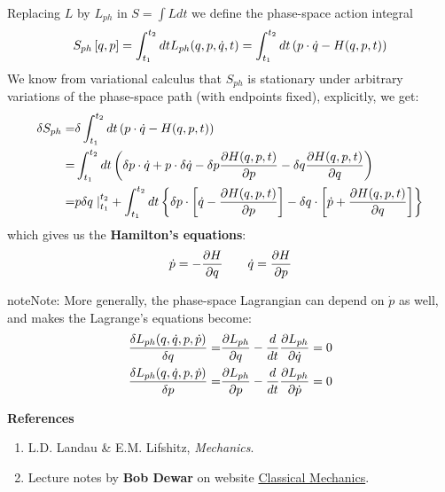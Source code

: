 \documentclass[letterpaper,10pt,english]{sphinxmanual}
\begin{document}
Replacing \(L\) by \(L_{ph}\) in \(S =
\int L dt\) we define the phase-space action integral
\begin{gather}
\begin{split}S_{ph}\left[q, p\right] = \int_{t_1}^{t_2}dt L_{ph}(q,p,\dot{q},t)=\int_{t_1}^{t_2}dt \left(p\cdot\dot{q}-H(q,p,t)\right)\end{split}\notag
\end{gather}
We know from variational calculus that \(S_{ph}\) is stationary under arbitrary
variations of the phase-space path (with endpoints fixed), explicitly, we get:
\begin{gather}
\begin{split}\delta S_{ph} =&\delta\int_{t_1}^{t_2}dt \left(p\cdot\dot{q}-H(q,p,t)\right) \\
=&\int_{t_1}^{t_2}dt \left(\delta p\cdot\dot{q}+p\cdot\delta\dot{q}-\delta p \frac{\partial H(q,p,t)}{\partial p}-\delta q \frac{\partial H(q,p,t)}{\partial q}\right) \\
=&p\delta q\left. \right |_{t_1}^{t_2}+\int_{t_1}^{t_2}dt \left\{\delta p\cdot\left[\dot{q}-\frac{\partial H(q,p,t)}{\partial p}\right]-\delta q\cdot\left[\dot{p}+ \frac{\partial H(q,p,t)}{\partial q}\right]\right\}\end{split}\notag
\end{gather}
which gives us the \textbf{Hamilton's equations}:
\begin{gather}
\begin{split}\dot{p}=-\frac{\partial H}{\partial q} \qquad \dot{q}=\frac{\partial H}{\partial p}\end{split}\notag
\end{gather}
\begin{notice}{note}{Note:}
More generally, the phase-space Lagrangian can depend on \(\dot{p}\) as well, and makes the Lagrange's equations become:
\begin{gather}
\begin{split}\frac{\delta L_{ph}(q,\dot{q},p,\dot{p})}{\delta q}=&\frac{\partial L_{ph}}{\partial q}-\frac{d}{dt}\frac{\partial L_{ph}}{\partial \dot{q}}=0 \\
\frac{\delta L_{ph}(q,\dot{q},p,\dot{p})}{\delta p}=&\frac{\partial L_{ph}}{\partial p}-\frac{d}{dt}\frac{\partial L_{ph}}{\partial \dot{p}}=0\end{split}\notag
\end{gather}\end{notice}

\textbf{References}
\begin{enumerate}
\item {} 
L.D. Landau \& E.M. Lifshitz, \emph{Mechanics}.

\item {} 
Lecture notes by \textbf{Bob Dewar} on website \href{http://people.physics.anu.edu.au/~rld105/C01\_ClassMech/}{Classical Mechanics}.

\end{enumerate}
\end{document}
